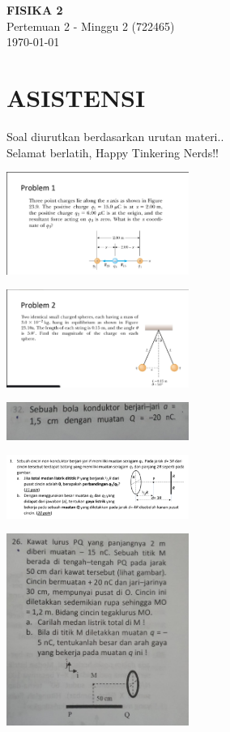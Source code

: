 \documentclass[twocolumn, 11pt]{article}%
\begin{document}
\begin{strip}
  \vspace*{\dimexpr-\stripsep}
  \begin{center}
      \Large\textbf{FISIKA 2}\\
      \large{Pertemuan 2 - Minggu 2 (722465)}\\
      \large{\today}
   \end{center}
\end{strip}

\section{ASISTENSI}
    Soal diurutkan berdasarkan urutan materi..\\
    Selamat berlatih, Happy Tinkering Nerds!!

    \begin{center}
        \includegraphics[width=225px]{1.jpg}
    \end{center}

    \begin{center}
        \includegraphics[width=225px]{2.jpg}
    \end{center}

    \begin{center}
        \includegraphics[width=225px]{3.jpg}
    \end{center}

    \begin{center}
        \includegraphics[width=225px]{4.jpg}
    \end{center}

    \begin{center}
        \includegraphics[width=225px]{5.jpg}
    \end{center}
\end{document}

